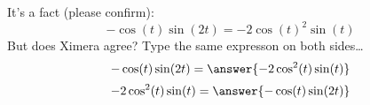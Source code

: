 \documentclass{ximera}
\begin{document}
\begin{exercise}
  It's a fact (please confirm):
  \[
  -\cos(t)\sin(2t) = -2\cos(t)^2\sin(t)
  \]
  But does Ximera agree? Type the same expresson on both sides\dots
  \[
  -\cos(t)\sin(2t) = \answer{-2\cos^2(t)\sin(t)}
  \]
  \[
  -2\cos^2(t)\sin(t) = \answer{-\cos(t)\sin(2t)}
  \]
\end{exercise}
\end{document}
